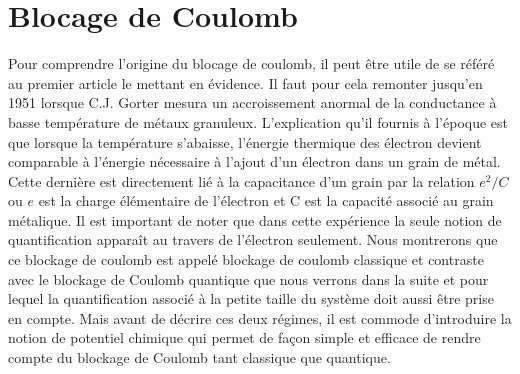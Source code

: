 \chapter{Blocage de Coulomb}
Pour comprendre l'origine du blocage de coulomb, il peut être utile de se référé au premier article le mettant en évidence. Il faut pour cela remonter jusqu'en 1951 lorsque C.J. Gorter mesura un accroissement anormal de la conductance à basse température de métaux granuleux. L'explication qu'il fournis à l'époque est que lorsque la température s'abaisse, l'énergie thermique des électron devient comparable à l'énergie nécessaire à l'ajout d'un électron dans un grain de métal. Cette dernière est directement lié à la capacitance d'un grain par la relation $e^2/C$ ou $e$ est la charge élémentaire de l'électron et C est la capacité associé au grain métalique. Il est important de noter que dans cette expérience la seule notion de quantification apparaît au travers de l'électron seulement. Nous montrerons que ce blockage de coulomb est appelé blockage de coulomb classique et contraste avec le blockage de Coulomb quantique que nous verrons dans la suite et pour lequel la quantification associé à la petite taille du système doit aussi être prise en compte. Mais avant de décrire ces deux régimes, il est commode d'introduire la notion de potentiel chimique qui permet de façon simple et efficace de rendre compte du blockage de Coulomb tant classique que quantique.

